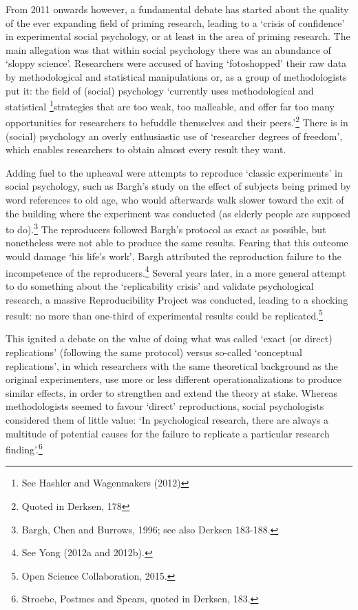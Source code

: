 \documentclass[twocolumn, serif, review, authordate]{jote-article}
\begin{document}
From 2011 onwards however, a fundamental debate has started about the quality of the ever expanding field of priming research, leading to a `crisis of confidence' in experimental social psychology, or at least in the area of priming research. The main allegation was that within social psychology there was an abundance of `sloppy science'. Researchers were accused of having `fotoshopped' their raw data by methodological and statistical manipulations or, as a group of methodologists put it: the field of (social) psychology `currently uses methodological and statistical \footnote{ See Hashler and Wagenmakers (2012)}strategies that are too weak, too malleable, and offer far too many opportunities for researchers to befuddle themselves and their peers.'\footnote{ Quoted in Derksen, 178} There is in (social) psychology an overly enthusiastic use of `researcher degrees of freedom', which enables researchers to obtain almost every result they want.

Adding fuel to the upheaval were attempts to reproduce `classic experiments' in social psychology, such as Bargh's study on the effect of subjects being primed by word references to old age, who would afterwards walk slower toward the exit of the building where the experiment was conducted (as elderly people are supposed to do).\footnote{ Bargh, Chen and Burrows, 1996; see also Derksen 183-188.} The reproducers followed Bargh's protocol as exact as possible, but nonetheless were not able to produce the same results. Fearing that this outcome would damage `his life's work', Bargh attributed the reproduction failure to the incompetence of the reproducers.\footnote{ See Yong (2012a and 2012b).} Several years later, in a more general attempt to do something about the `replicability crisis' and validate psychological research, a massive Reproducibility Project was conducted, leading to a shocking result: no more than one-third of experimental results could be replicated.\footnote{ Open Science Collaboration, 2015.} 

This ignited a debate on the value of doing what was called `exact (or direct) replications' (following the same protocol) versus so-called `conceptual replications', in which researchers with the same theoretical background as the original experimenters, use more or less different operationalizations to produce similar effects, in order to strengthen and extend the theory at stake. Whereas methodologists seemed to favour `direct' reproductions, social psychologists considered them of little value: `In psychological research, there are always a multitude of potential causes for the failure to replicate a particular research finding'.\footnote{ Stroebe, Postmes and Spears, quoted in Derksen, 183.} 
\end{document}
